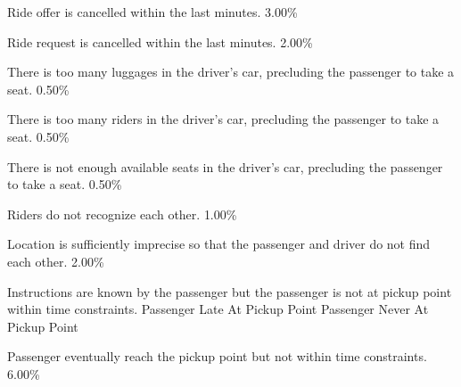   \startkaosspec
  	 {Ride offer is cancelled within the last minutes.}
  	 {3.00\%}
  \stopkaosspec
  
  \startkaosspec
  	 {Ride request is cancelled within the last minutes.}
  	 {2.00\%}
  \stopkaosspec
  
  \startkaosspec
  	 {There is too many luggages in the driver’s car, precluding the passenger to take a seat.}
  	 {0.50\%}
  \stopkaosspec
  
  \startkaosspec
  	 {There is too many riders in the driver’s car, precluding the passenger to take a seat.}
  	 {0.50\%}
  \stopkaosspec
  
  \startkaosspec
  	 {There is not enough available seats in the driver’s car, precluding the passenger to take a seat.}
  	 {0.50\%}
  \stopkaosspec
  
  \startkaosspec
  	 {Riders do not recognize each other.}
  	 {1.00\%}
  \stopkaosspec
  
  \startkaosspec
  	 {Location is sufficiently imprecise so that the passenger and driver do not find each other.}
  	 {2.00\%}
  \stopkaosspec
  

    {}

  \startkaosspec
  	 {Instructions are known by the passenger but the passenger is not at pickup point within time constraints.}
  	 {Passenger Late At Pickup Point}
  	 {Passenger Never At Pickup Point}
  \stopkaosspec
  
  \startkaosspec
  	 {Passenger eventually reach the pickup point but not within time constraints.}
  	 {6.00\%}
  \stopkaosspec
  
